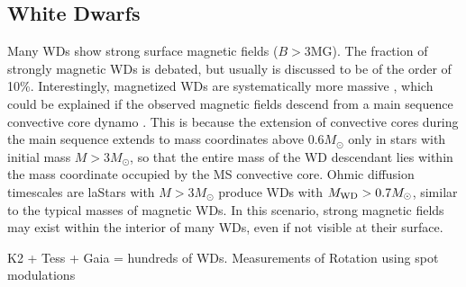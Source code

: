 {\color{red} \subsection{White Dwarfs}}
Many WDs show strong surface magnetic fields ($B>$3MG). The fraction of strongly magnetic WDs is debated, but usually is discussed to be of the order of 10\%. Interestingly, magnetized WDs are systematically more massive \cite{Ferrario_2015}, which could be explained if the observed magnetic fields descend from a main sequence convective core dynamo \cite{Cantiello_2016}. This is because the extension of convective cores during the main sequence extends to mass coordinates above 0.6$M_\odot$ only in stars with initial mass $M>3M_\odot$, so that the entire mass of the WD descendant lies within the mass coordinate occupied by the MS convective core. Ohmic diffusion timescales are laStars with $M>3M_\odot$ produce WDs with $M_{\rm WD}>0.7M_\odot$, similar to the typical masses of magnetic WDs. In this scenario, strong magnetic fields may exist within the interior of many WDs, even if not visible at their surface. 

K2 + Tess + Gaia = hundreds of WDs. Measurements of Rotation using spot modulations